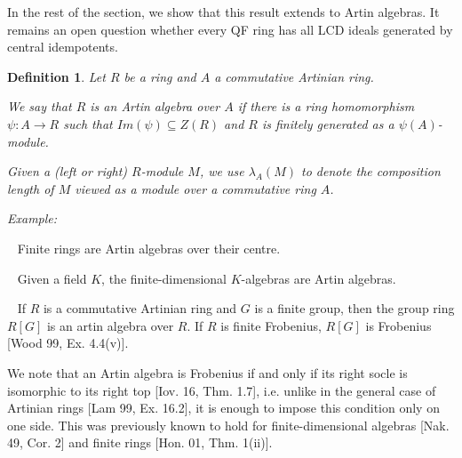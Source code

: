 \documentclass{article}
\theoremstyle{plain}
\theoremstyle{plain}
\newtheorem{Def}[veta]{Definition}
\theoremstyle{remark}
\theoremstyle{plain}
\begin{document}
In the rest of the section, we show that this result extends to Artin algebras. It remains an open question whether every QF ring has all LCD ideals generated by central idempotents.

\begin{Def}
    Let $R$ be a ring and $A$ a commutative Artinian ring.

    We say that $R$ is an \emph{Artin algebra over $A$} if there is a ring homomorphism $\psi \colon A\to R$ such that $Im(\psi)\subseteq Z(R)$ and $R$ is finitely generated as a $\psi(A)$-module.

    Given a (left or right) $R$-module $M$, we use $\lambda_A(M)$ to denote the composition length of $M$ viewed as a module over a commutative ring $A$.
\end{Def}
\textit{Example:}

\noindent      \textbullet~  Finite rings are Artin algebras over their centre.

\noindent      \textbullet~ Given a field $K$, the finite-dimensional $K$-algebras are Artin algebras.

\noindent      \textbullet~  If $R$ is a commutative Artinian ring and $G$ is a finite group, then the group ring $R[G]$ is an artin algebra over $R$. If $R$ is finite Frobenius, $R[G]$ is Frobenius [Wood 99, Ex. 4.4(v)].

    \medskip 

 We note that an Artin algebra is Frobenius if and only if its right socle is isomorphic to its right top [Iov. 16, Thm. 1.7], i.e. unlike in the general case of Artinian rings [Lam 99, Ex. 16.2], it is enough to impose this condition only on one side. This was previously known to hold for finite-dimensional algebras [Nak. 49, Cor. 2] and finite rings [Hon. 01, Thm. 1(ii)].
\end{document}
